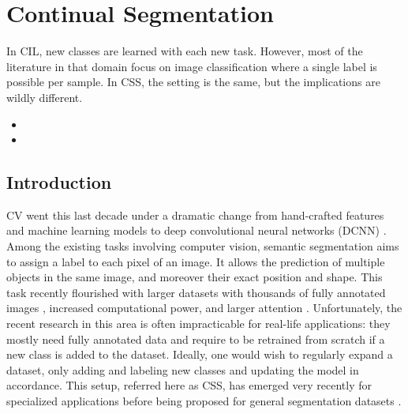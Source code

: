 \chapter{Continual Segmentation}
\label{chapter:segmentation}

\begin{chapabstract}
    In \acf{CIL}, new classes are learned with each new task. However, most of the literature in
    that domain focus on image classification where a single label is possible per sample. In
    \acf{CSS}, the setting is the same, but the implications are wildly different.


    \begin{itemize}
        \item {}
        \item {}
    \end{itemize}

\end{chapabstract}
\newpage

\minitoc
{}



\section{Introduction}
\label{sec:seg_intro}

\acf{CV} went this last decade under a dramatic change from hand-crafted features
\cite{lowe1999sift,perronnin2007fisherkernels} and machine learning models \cite{cortes1995svm} to
deep convolutional neural networks (\acs{DCNN}) \cite{krizhevsky2012alexnet}. Among the existing tasks
involving computer vision, semantic segmentation aims to assign a label to each pixel of an image.
It allows the prediction of multiple objects in the same image, and moreover their exact position
and shape. This task recently flourished \cite{tao2020HRNet,zhang2020resnest,chen2018ZPSA} with
larger datasets with thousands of fully annotated images
\cite{zhou2017adedataset,neuhold2017mapillary}, increased computational power, and larger attention
\cite{wang2020axialdeeplab}. Unfortunately, the recent research in this area is often impracticable
for real-life applications: they mostly need fully annotated data and require to be retrained from
scratch if a new class is added to the dataset. Ideally, one would wish to regularly expand a
dataset, only adding and labeling new classes and updating the model in accordance. This setup,
referred here as \acf{CSS}, has emerged very recently for specialized
applications
\cite{ozdemir2018learnthenewkeeptheold,ozdemir2019segmentationanotomical,tasar19incrementsegmentationremotesensing}
before being proposed for general segmentation datasets
\cite{michieli2019ilt,cermelli2020modelingthebackground,douillard2020plop}.


